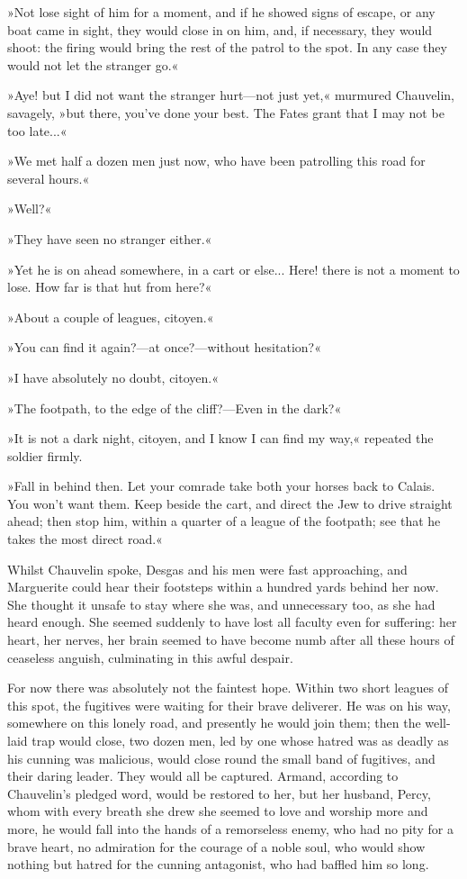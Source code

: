 »Not lose sight of him for a moment, and if he showed signs of escape, or any boat came in sight, they would close in on him, and, if necessary, they would shoot: the firing would bring the rest of the patrol to the spot. In any case they would not let the stranger go.«

»Aye! but I did not want the stranger hurt\allowbreak---\allowbreak not just yet,« murmured Chauvelin, savagely, »but there, you've done your best. The Fates grant that I may not be too late...«

»We met half a dozen men just now, who have been patrolling this road for several hours.«

»Well?«

»They have seen no stranger either.«

»Yet he is on ahead somewhere, in a cart or else... Here! there is not a moment to lose. How far is that hut from here?«

»About a couple of leagues, citoyen.«

»You can find it again?\allowbreak---\allowbreak at once?\allowbreak---\allowbreak without hesitation?«

»I have absolutely no doubt, citoyen.«

»The footpath, to the edge of the cliff?\allowbreak---\allowbreak Even in the dark?«

»It is not a dark night, citoyen, and I know I can find my way,« repeated the soldier firmly.

»Fall in behind then. Let your comrade take both your horses back to Calais. You won't want them. Keep beside the cart, and direct the Jew to drive straight ahead; then stop him, within a quarter of a league of the footpath; see that he takes the most direct road.«

Whilst Chauvelin spoke, Desgas and his men were fast approaching, and Marguerite could hear their footsteps within a hundred yards behind her now. She thought it unsafe to stay where she was, and unnecessary too, as she had heard enough. She seemed suddenly to have lost all faculty even for suffering: her heart, her nerves, her brain seemed to have become numb after all these hours of ceaseless anguish, culminating in this awful despair.

For now there was absolutely not the faintest hope. Within two short leagues of this spot, the fugitives were waiting for their brave deliverer. He was on his way, somewhere on this lonely road, and presently he would join them; then the well-laid trap would close, two dozen men, led by one whose hatred was as deadly as his cunning was malicious, would close round the small band of fugitives, and their daring leader. They would all be captured. Armand, according to Chauvelin's pledged word, would be restored to her, but her husband, Percy, whom with every breath she drew she seemed to love and worship more and more, he would fall into the hands of a remorseless enemy, who had no pity for a brave heart, no admiration for the courage of a noble soul, who would show nothing but hatred for the cunning antagonist, who had baffled him so long.

